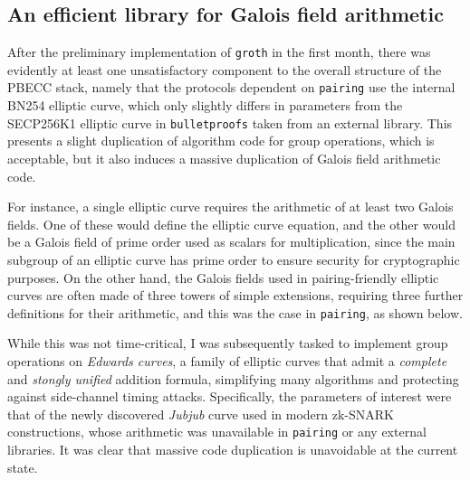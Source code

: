 \documentclass[11pt]{article}
\begin{document}
\pagebreak

\subsection{An efficient library for Galois field arithmetic}

After the preliminary implementation of \texttt{groth} in the first month, there was evidently at least one unsatisfactory component to the overall structure of the PBECC stack, namely that the protocols dependent on \texttt{pairing} use the internal BN254 elliptic curve, which only slightly differs in parameters from the SECP256K1 elliptic curve in \texttt{bulletproofs} taken from an external library. This presents a slight duplication of algorithm code for group operations, which is acceptable, but it also induces a massive duplication of Galois field arithmetic code.

For instance, a single elliptic curve requires the arithmetic of at least two Galois fields. One of these would define the elliptic curve equation, and the other would be a Galois field of prime order used as scalars for multiplication, since the main subgroup of an elliptic curve has prime order to ensure security for cryptographic purposes. On the other hand, the Galois fields used in pairing-friendly elliptic curves are often made of three towers of simple extensions, requiring three further definitions for their arithmetic, and this was the case in \texttt{pairing}, as shown below.
\begin{center}
\end{center}

While this was not time-critical, I was subsequently tasked to implement group operations on \emph{Edwards curves}, a family of elliptic curves that admit a \emph{complete} and \emph{stongly unified} addition formula, simplifying many algorithms and protecting against side-channel timing attacks. Specifically, the parameters of interest were that of the newly discovered \emph{Jubjub} curve \cite{jubjub} used in modern zk-SNARK constructions, whose arithmetic was unavailable in \texttt{pairing} or any external libraries. It was clear that massive code duplication is unavoidable at the current state.
\end{document}
